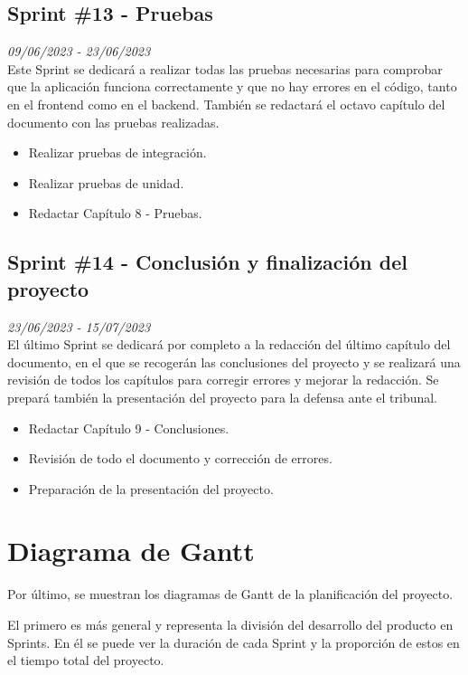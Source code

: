 \subsection{Sprint \#13 - Pruebas }
\textit{09/06/2023   -   23/06/2023}\\

Este Sprint se dedicará a realizar todas las pruebas necesarias para comprobar que la aplicación funciona correctamente y que no hay errores en el código, tanto
en el frontend como en el backend. También se redactará el octavo capítulo del documento con las pruebas realizadas.

\begin{itemize}
    \item Realizar pruebas de integración.
    \item Realizar pruebas de unidad.
    \item Redactar Capítulo 8 - Pruebas.
\end{itemize}

\subsection{Sprint \#14 - Conclusión y finalización del proyecto}
\textit{23/06/2023   -   15/07/2023}\\

El último Sprint se dedicará por completo a la redacción del último capítulo del documento, en el que se recogerán las conclusiones del proyecto y se realizará una revisión
de todos los capítulos para corregir errores y mejorar la redacción. Se prepará también la presentación del proyecto para la defensa ante el tribunal.
\begin{itemize}
    \item Redactar Capítulo 9 - Conclusiones.
    \item Revisión de todo el documento y corrección de errores.
    \item Preparación de la presentación del proyecto.
\end{itemize}


\section{Diagrama de Gantt}
Por último, se muestran los diagramas de Gantt de la planificación del proyecto. 


El primero es más general y representa la división del desarrollo del producto en Sprints.
En él se puede ver la duración de cada Sprint y la proporción de estos en el tiempo total del proyecto. 

